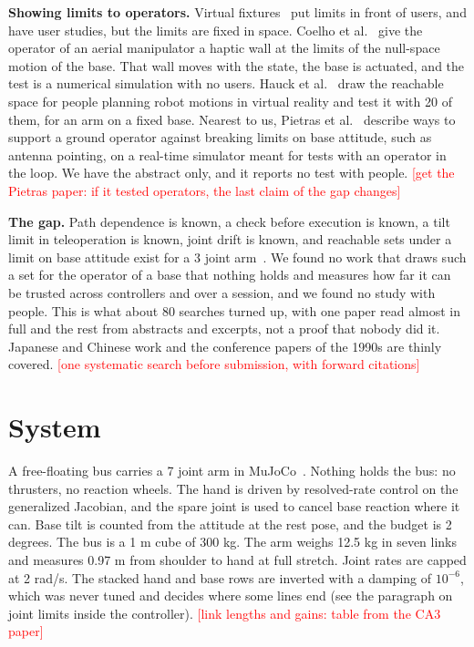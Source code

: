 \documentclass[pdflatex,sn-mathphys-num]{sn-jnl}
\newcommand{\todo}[1]{\textcolor{red}{[#1]}}
\begin{document}
\textbf{Showing limits to operators.} Virtual fixtures~\cite{rosenberg1993,abbott2007} put limits in front of
users, and have user studies, but the limits are fixed in space. Coelho et al.~\cite{coelho2020} give the operator
of an aerial manipulator a haptic wall at the limits of the null-space motion of the base. That wall moves with
the state, the base is actuated, and the test is a numerical simulation with no users. Hauck et al.~\cite{hauck2025}
draw the reachable space for people planning robot motions in virtual reality and test it with 20 of them, for an
arm on a fixed base. Nearest to us, Pietras et al.~\cite{pietras2010} describe ways to support a ground operator
against breaking limits on base attitude, such as antenna pointing, on a real-time simulator meant for tests with an
operator in the loop. We have the abstract only, and it reports no test with people. \todo{get the Pietras paper: if
it tested operators, the last claim of the gap changes}

\textbf{The gap.} Path dependence is known, a check before execution is known, a tilt limit in teleoperation is
known, joint drift is known, and reachable sets under a limit on base attitude exist for a 3 joint
arm~\cite{jia2019}. We found no work that draws such a set for the operator of a base that nothing holds and
measures how far it can be trusted across controllers and over a session, and we found no study with people. This is
what about 80 searches turned up, with one paper read almost in full and the rest from abstracts and excerpts, not a
proof that nobody did it. Japanese and Chinese work and the conference papers of the 1990s are thinly covered.
\todo{one systematic search before submission, with forward citations}

\section{System}
A free-floating bus carries a 7 joint arm in MuJoCo~\cite{todorov2012}. Nothing holds the bus: no thrusters, no
reaction wheels. The hand is driven by resolved-rate control on the generalized Jacobian, and the spare joint is
used to cancel base reaction where it can. Base tilt is counted from the attitude at the rest pose, and the
budget is 2 degrees. The bus is a 1 m cube of 300 kg. The arm weighs 12.5 kg in seven links and measures 0.97 m from
shoulder to hand at full stretch. Joint rates are capped at 2 rad/s. The stacked hand and base rows are inverted
with a damping of $10^{-6}$, which was never tuned and decides where some lines end (see the paragraph on joint
limits inside the controller). \todo{link lengths and gains: table from the CA3 paper}
\end{document}
